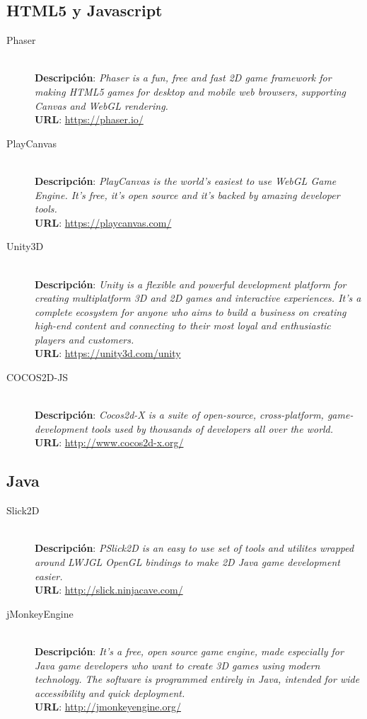 \subsection{HTML5 y Javascript}
\begin{description}
\item[Phaser] \hfill \\
\textbf{Descripción}: \emph{Phaser is a fun, free and fast 2D game framework for making HTML5 games for desktop and mobile web browsers, supporting Canvas and WebGL rendering.} \\
\textbf{URL}: \url{https://phaser.io/}
\item[PlayCanvas] \hfill \\
\textbf{Descripción}: \emph{PlayCanvas is the world's easiest to use WebGL Game Engine. It's free, it's open source and it's backed by amazing developer tools.} \\
\textbf{URL}: \url{https://playcanvas.com/}
\item[Unity3D] \hfill \\
\textbf{Descripción}: \emph{Unity is a flexible and powerful development platform for creating multiplatform 3D and 2D games and interactive experiences. It's a complete ecosystem for anyone who aims to build a business on creating high-end content and connecting to their most loyal and enthusiastic players and customers.} \\
\textbf{URL}: \url{https://unity3d.com/unity}
\item[COCOS2D-JS] \hfill \\
\textbf{Descripción}: \emph{Cocos2d-X is a suite of open-source, cross-platform, game-development tools used by thousands of developers all over the world.} \\
\textbf{URL}: \url{http://www.cocos2d-x.org/}
\end{description}

\subsection{Java}
\begin{description}
\item[Slick2D] \hfill \\
\textbf{Descripción}: \emph{PSlick2D is an easy to use set of tools and utilites wrapped around LWJGL OpenGL bindings to make 2D Java game development easier.} \\
\textbf{URL}: \url{http://slick.ninjacave.com/}
\item[jMonkeyEngine] \hfill \\
\textbf{Descripción}: \emph{It’s a free, open source game engine, made especially for Java game developers who want to create 3D games using modern technology. The software is programmed entirely in Java, intended for wide accessibility and quick deployment.} \\
\textbf{URL}: \url{http://jmonkeyengine.org/}
\end{description}

